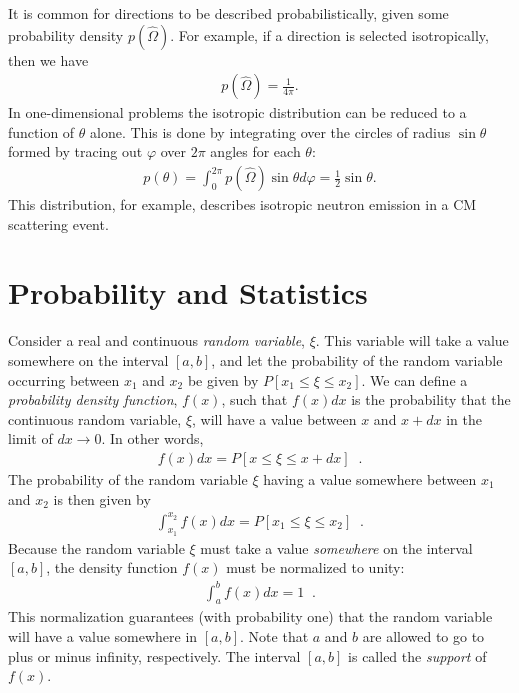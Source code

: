 \documentclass[11pt]{article}
\begin{document}
It is common for directions to be described probabilistically, given some probability density \(p\left(\hat{\Omega}\right)\).  For example, if a direction is selected isotropically, then we have
\begin{align}
  p\left(\hat{\Omega}\right) = \frac{1}{4\pi}.
\end{align}
In one-dimensional problems the isotropic distribution can be reduced to a function of \(\theta\) alone.  This is done by integrating over the circles of radius \(\sin\theta\) formed by tracing out \(\varphi\) over \(2\pi\) angles for each \(\theta\):
\begin{align}
  p(\theta) = \int_0^{2\pi} p\left(\hat{\Omega}\right) \sin\theta d\varphi
            = \frac{1}{2} \sin\theta.
\end{align}
This distribution, for example, describes isotropic neutron emission in a CM scattering event.

\section{Probability and Statistics}
\label{sec:orgheadline44}
Consider a real and continuous \emph{random variable}, \(\xi\).  This variable will take a value somewhere on the interval \([a,b]\), and let the probability of the random variable occurring between \(x_1\) and \(x_2\) be given by \(P\left[ x_1 \leq \xi \leq x_2 \right]\).  We can define a \emph{probability density function}, \(f(x)\), such that \(f(x)dx\) is the probability that the continuous random variable, \(\xi\), will have a value between \(x\) and \(x+dx\) in the limit of \(dx \rightarrow 0\).  In other words,
\begin{align}
  \label{eq::probDensFuncDef}
  f(x)dx = P\left[ x \leq \xi \leq x+dx \right] \;\;.
\end{align}
The probability of the random variable \(\xi\) having a value somewhere between \(x_1\) and \(x_2\) is then given by
\begin{align}
  \int_{x_1}^{x_2} f(x) dx = P\left[ x_1 \leq \xi \leq x_2 \right] \;\;.
\end{align}
Because the random variable \(\xi\) must take a value \emph{somewhere} on the interval \([a,b]\), the density function \(f(x)\) must be normalized to unity:
\begin{align}
  \int_a^b f(x) dx = 1 \;\;.
\end{align}
This normalization guarantees (with probability one) that the random variable will have a value somewhere in \([a,b]\).  Note that \(a\) and \(b\) are allowed to go to plus or minus infinity, respectively.  The interval \([a,b]\) is called the \emph{support} of \(f(x)\).
\end{document}
